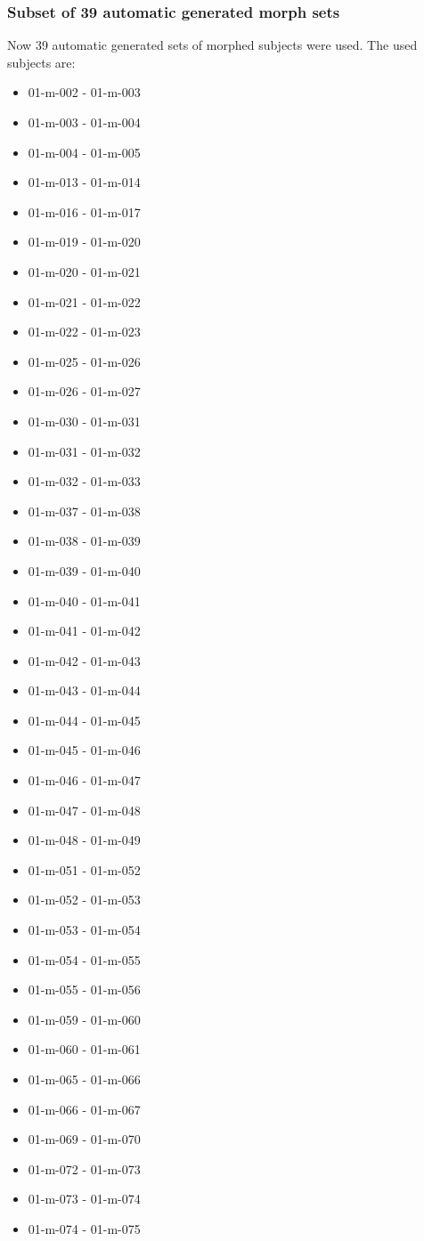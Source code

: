 \subsubsection{Subset of 39 automatic generated morph sets}\label{sec:subset39}
Now 39 automatic generated sets of morphed subjects were used. The used subjects are:
\begin{multicols}{3}
\begin{itemize}
\item 01-m-002 - 01-m-003
\item 01-m-003 - 01-m-004
\item 01-m-004 - 01-m-005
\item 01-m-013 - 01-m-014
\item 01-m-016 - 01-m-017
\item 01-m-019 - 01-m-020
\item 01-m-020 - 01-m-021
\item 01-m-021 - 01-m-022
\item 01-m-022 - 01-m-023
\item 01-m-025 - 01-m-026
\item 01-m-026 - 01-m-027
\item 01-m-030 - 01-m-031
\item 01-m-031 - 01-m-032
\item 01-m-032 - 01-m-033
\item 01-m-037 - 01-m-038
\item 01-m-038 - 01-m-039
\item 01-m-039 - 01-m-040
\item 01-m-040 - 01-m-041
\item 01-m-041 - 01-m-042
\item 01-m-042 - 01-m-043
\item 01-m-043 - 01-m-044
\item 01-m-044 - 01-m-045
\item 01-m-045 - 01-m-046
\item 01-m-046 - 01-m-047
\item 01-m-047 - 01-m-048
\item 01-m-048 - 01-m-049
\item 01-m-051 - 01-m-052
\item 01-m-052 - 01-m-053
\item 01-m-053 - 01-m-054
\item 01-m-054 - 01-m-055
\item 01-m-055 - 01-m-056
\item 01-m-059 - 01-m-060
\item 01-m-060 - 01-m-061
\item 01-m-065 - 01-m-066
\item 01-m-066 - 01-m-067
\item 01-m-069 - 01-m-070
\item 01-m-072 - 01-m-073
\item 01-m-073 - 01-m-074
\item 01-m-074 - 01-m-075
\end{itemize}
\end{multicols}


